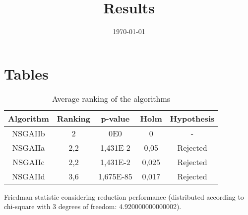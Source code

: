 \documentclass{article}
\title{Results}
\author{}
\date{\today}
\begin{document}
\oddsidemargin 0in \topmargin 0in\maketitle

\section{Tables}
\begin{table}[!htp]
\centering
\begin{tabular}{c|c|c|c|c}
Algorithm&Ranking&p-value&Holm&Hypothesis\\
\hline
NSGAIIb & 2 & 0E0 & 0 & -\\
NSGAIIa & 2,2 & 1,431E-2 & 0,05 & Rejected\\
NSGAIIc & 2,2 & 1,431E-2 & 0,025 & Rejected\\
NSGAIId & 3,6 & 1,675E-85 & 0,017 & Rejected\\
\end{tabular}
\caption{Average ranking of the algorithms}
\end{table}


Friedman statistic considering reduction performance (distributed according to chi-square with 3 degrees of freedom: 4.920000000000002).
\end{document}
